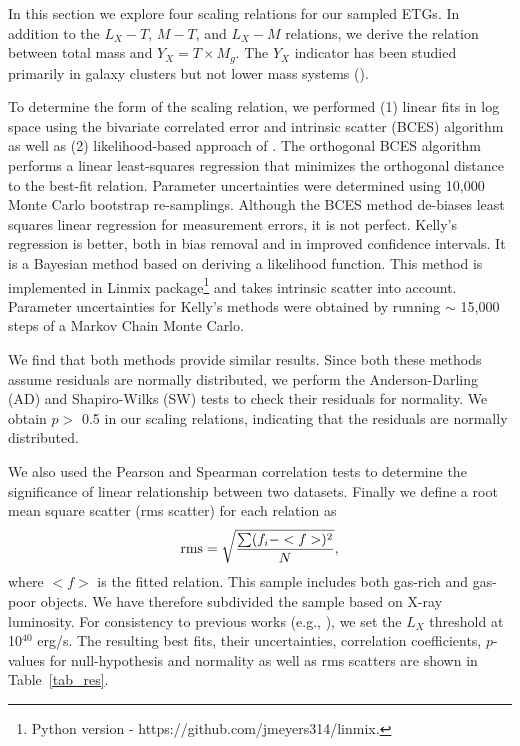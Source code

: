 \documentclass[iop]{emulateapj}
\begin{document}
In this section we explore four scaling relations for our sampled ETGs. In addition to the $L_X-T$, $M-T$, and $L_X-M$ relations, we derive the relation between total mass and $Y_X = T \times M_g$. The $Y_X$ indicator has been studied primarily in galaxy clusters but not lower mass systems (\citealt{Kravtsov:06, Nagai:07}). 

To determine the form of the scaling relation, we performed (1) linear fits in log space using the bivariate correlated error and intrinsic scatter (BCES) algorithm \citep{Akritas:96} as well as (2) likelihood-based approach of \citet{Kelly:07}. The orthogonal BCES algorithm performs a linear least-squares regression that minimizes the orthogonal distance to the best-fit relation. Parameter uncertainties were determined using 10,000 Monte Carlo bootstrap re-samplings. Although the BCES method de-biases least squares linear regression for measurement errors, it is not perfect. Kelly's regression is better, both in bias removal and in improved confidence intervals. It is a Bayesian method based on deriving a likelihood function. This method is implemented in Linmix package\footnote{Python version - https://github.com/jmeyers314/linmix.} and takes intrinsic scatter into account. Parameter uncertainties for Kelly's methods were obtained by running $\sim$ 15,000 steps of a Markov Chain Monte Carlo.

We find that both methods provide similar results. Since both these methods assume residuals are normally distributed, we perform the Anderson-Darling (AD) and Shapiro-Wilks (SW) tests to check their residuals for normality. We obtain $p >$ 0.5 in our scaling relations, indicating that the residuals are normally distributed.

We also used the Pearson and Spearman correlation tests to determine the significance of linear relationship between two datasets. Finally we define a root mean square scatter (rms scatter) for each relation as
\begin{equation}
{\rm rms} = \sqrt{\frac{\sum(f_{i}-< f >)^{2}}{N}},
\label{rms}
\end{equation}
where $<f>$ is the fitted relation. This sample includes both gas-rich and gas-poor objects.  We have therefore subdivided the sample based on X-ray luminosity. For consistency to previous works (e.g., \citet{Kim:13, Kim:15}), we set the $L_X$ threshold at 10$^{40}$ erg/s. The resulting best fits, their uncertainties, correlation coefficients, $p$-values for null-hypothesis and normality as well as rms scatters are shown in Table~\ref{tab_res}. 
\end{document}
